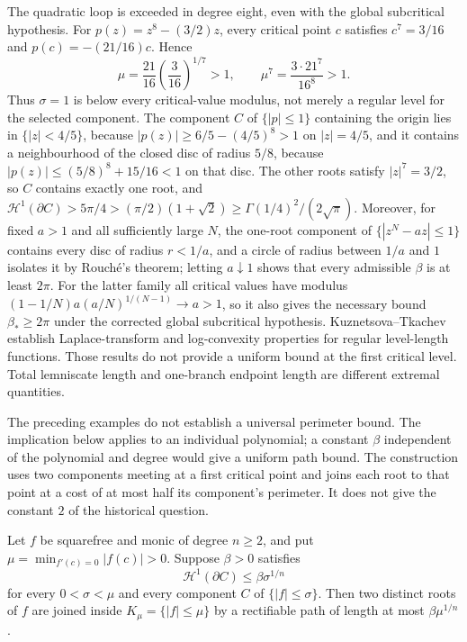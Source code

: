The quadratic loop is exceeded in degree eight, even with the global
subcritical hypothesis. For $p(z)=z^8-(3/2)z$, every critical point $c$
satisfies $c^7=3/16$ and $p(c)=-(21/16)c$. Hence
\[
 \mu=\frac{21}{16}\left(\frac3{16}\right)^{1/7}>1,
 \qquad \mu^7=\frac{3\cdot21^7}{16^8}>1.
\]
Thus $\sigma=1$ is below every critical-value modulus, not merely a
regular level for the selected component. The component $C$ of
$\{|p|\le1\}$ containing the origin lies in
$\{|z|<4/5\}$, because $|p(z)|\ge6/5-(4/5)^8>1$ on $|z|=4/5$, and it contains a
neighbourhood of the closed disc of radius $5/8$, because
$|p(z)|\le(5/8)^8+15/16<1$ on that disc.  The other roots satisfy
$|z|^7=3/2$, so $C$ contains exactly one root, and
$\mathcal H^1(\partial C)>5\pi/4>(\pi/2)(1+\sqrt2)\ge\Gamma(1/4)^2/(2\sqrt\pi)$.  Moreover,
for fixed $a>1$ and all sufficiently large $N$, the one-root component of
$\{|z^N-az|\le1\}$ contains every disc of radius $r<1/a$, and a circle of
radius between $1/a$ and $1$ isolates it by Rouch\'e's theorem; letting
$a\downarrow1$ shows that every admissible $\beta$ is at least $2\pi$.
For the latter family all critical values have modulus
$(1-1/N)a(a/N)^{1/(N-1)}\to a>1$, so it also gives the necessary bound
$\beta_*\ge2\pi$ under the corrected global subcritical hypothesis.
Kuznetsova--Tkachev \cite[Theorems~1--2]{kuznetsova2003} establish
Laplace-transform and log-convexity properties for regular level-length
functions.  Those results do not provide a uniform bound at the first
critical level.  Total lemniscate length and one-branch endpoint length are
different extremal quantities.

The preceding examples do not establish a universal perimeter bound.
The implication below applies to an individual polynomial; a constant
$\beta$ independent of the polynomial and degree would give a uniform
path bound. The construction uses two components meeting at a first
critical point and joins each root to that point at a cost of at most
half its component's perimeter. It does not give the constant $2$ of
the historical question.

\begin{remark}
\label{res:conjecture-p-consumer}
Let $f$ be squarefree and monic of degree $n\ge2$, and put
$\mu=\min_{f'(c)=0}|f(c)|>0$. Suppose $\beta>0$ satisfies
\[
 \mathcal H^1(\partial C)\le\beta\sigma^{1/n}
\]
for every $0<\sigma<\mu$ and every component $C$ of $\{|f|\le\sigma\}$.
Then two distinct roots of $f$ are joined inside $K_\mu=\{|f|\le\mu\}$
by a rectifiable path of length at most $\beta\mu^{1/n}$.
\end{remark}


